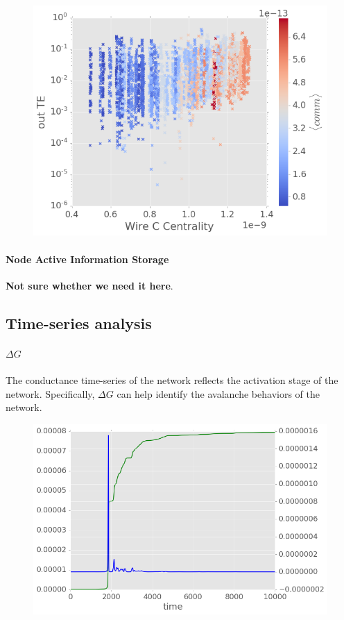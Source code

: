 \documentclass[%
 reprint,
 amsmath,amssymb,
 aps,
]{revtex4-2}
\begin{document}
\begin{figure}[h]
	\centering
	\includegraphics[width=1\linewidth]{figure/out_TE}
	\caption{}
	\label{fig:out_te}
\end{figure}


\paragraph{Node Active Information Storage}
\textbf{Not sure whether we need it here}.

\subsection{Time-series analysis}

\paragraph{$\Delta G$}

The conductance time-series of the network reflects the activation stage of the network. Specifically, $\Delta G$ can help identify the avalanche behaviors of the network.

\begin{figure}[h]
	\centering
	\includegraphics[width=1\linewidth]{figure/G_dG_t}
	\caption{}
	\label{fig:g_dg_t}
\end{figure}
\end{document}
